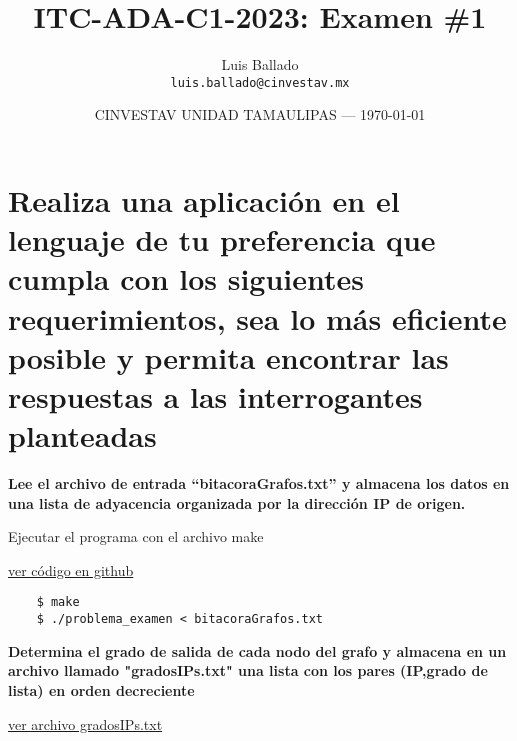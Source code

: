 \documentclass{article}
\title{ITC-ADA-C1-2023: Examen \#1} %
\author{Luis Ballado\\ \texttt{luis.ballado@cinvestav.mx}} %
\date{CINVESTAV UNIDAD TAMAULIPAS --- \today} %
\begin{document}
\maketitle %


\section{Realiza una aplicación en el lenguaje de tu preferencia que cumpla con los siguientes requerimientos, sea lo más eficiente posible y permita encontrar las respuestas a las interrogantes planteadas}

\begin{question}
  \textbf{Lee el archivo de entrada “bitacoraGrafos.txt” y almacena los datos en una lista de adyacencia organizada por la dirección IP de origen.}
\end{question}


\begin{warn}[]
  Ejecutar el programa con el archivo make
\end{warn}

\href{https://github.com/luisballado/ADA/blob/main/practice_code/problem_exam/problema_examen.cpp}{ver código en github}\\   

\begin{commandline}
  \begin{verbatim}
    $ make
    $ ./problema_examen < bitacoraGrafos.txt
  \end{verbatim}
\end{commandline}


\begin{question}
  \textbf{Determina el grado de salida de cada nodo del grafo y almacena en un archivo llamado "gradosIPs.txt" una lista con los pares (IP,grado de lista) en orden decreciente}
\end{question}

\begin{warn}[]
  \href{https://github.com/luisballado/ADA/blob/main/practice_code/problem_exam/gradosIPs.txt}{ver archivo gradosIPs.txt}\\   
\end{warn}
\end{document}
